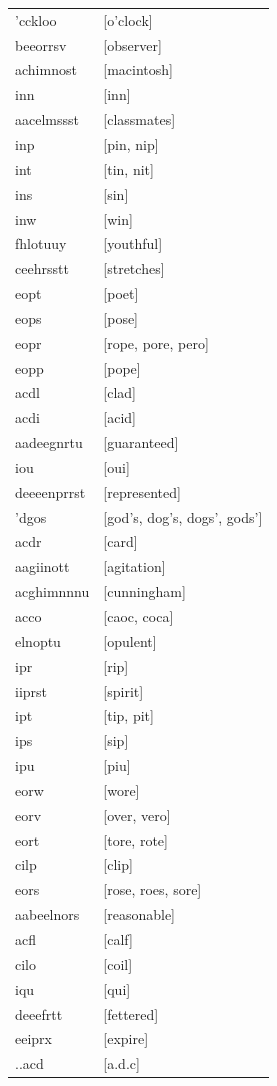 \documentclass{article}
\begin{document}
\begin{tabular}{ll}
'cckloo & [o'clock] \\
beeorrsv & [observer] \\
achimnost & [macintosh] \\
inn & [inn] \\
aacelmssst & [classmates] \\
inp & [pin, nip] \\
int & [tin, nit] \\
ins & [sin] \\
inw & [win] \\
fhlotuuy & [youthful] \\
ceehrsstt & [stretches] \\
eopt & [poet] \\
eops & [pose] \\
eopr & [rope, pore, pero] \\
eopp & [pope] \\
acdl & [clad] \\
acdi & [acid] \\
aadeegnrtu & [guaranteed] \\
iou & [oui] \\
deeeenprrst & [represented] \\
'dgos & [god's, dog's, dogs', gods'] \\
acdr & [card] \\
aagiinott & [agitation] \\
acghimnnnu & [cunningham] \\
acco & [caoc, coca] \\
elnoptu & [opulent] \\
ipr & [rip] \\
iiprst & [spirit] \\
ipt & [tip, pit] \\
ips & [sip] \\
ipu & [piu] \\
eorw & [wore] \\
eorv & [over, vero] \\
eort & [tore, rote] \\
cilp & [clip] \\
eors & [rose, roes, sore] \\
aabeelnors & [reasonable] \\
acfl & [calf] \\
cilo & [coil] \\
iqu & [qui] \\
deeefrtt & [fettered] \\
eeiprx & [expire] \\
..acd & [a.d.c] \\

\end{tabular}
\end{document}
